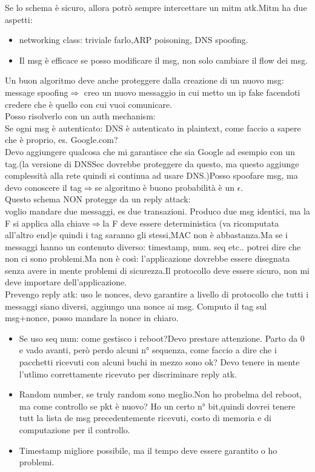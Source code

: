 \documentclass[16px]{article}
\begin{document}
Se lo schema è sicuro, allora potrò sempre intercettare un mitm atk.Mitm ha due aspetti:
\begin{itemize}
\item networking class: triviale farlo,ARP poisoning, DNS spoofing.\\
\item Il msg è efficace se posso modificare il msg, non solo cambiare il flow dei msg.
\end{itemize}
Un buon algoritmo deve anche proteggere dalla creazione di un nuovo msg: message spoofing$\Rightarrow$ creo un nuovo messaggio in cui metto un ip fake facendoti credere che è quello con cui vuoi comunicare.\\
Posso risolverlo con un auth mechanism:\\
Se ogni msg è autenticato: DNS è autenticato in plaintext, come faccio a sapere che è proprio, es. Google.com?\\
Devo aggiungere qualcosa che mi garantisce che sia Google ad esempio con un tag.(la versione di DNSSec dovrebbe proteggere da questo, ma questo aggiunge complessità alla rete quindi si continua ad usare DNS.)Posso spoofare msg, ma devo conoscere il tag$\Rightarrow$se algoritmo è buono probabilità è un $\epsilon$.\\
Questo schema NON protegge da un reply attack:\\
voglio mandare due messaggi, es due transazioni. Produco due msg identici, ma la F si applica alla chiave$\Rightarrow$la F deve essere deterministica (va ricomputata all'altro end)e quindi i tag saranno gli stessi,MAC non è abbastanza.Ma se i messaggi hanno un contenuto diverso: timestamp, num. seq etc.. potrei dire che non ci sono problemi.Ma non è così: l'applicazione dovrebbe essere disegnata senza avere in mente problemi di sicurezza.Il protocollo deve essere sicuro, non mi deve importare dell'applicazione.\\
Prevengo reply atk: uso le nonces, devo garantire a livello di protocollo che tutti i messaggi siano diversi, aggiungo una nonce ai msg. Computo il tag sul msg+nonce, posso mandare la nonce in chiaro.\\
\begin{itemize}
\item Se uso seq num: come gestisco i reboot?Devo prestare attenzione.
Parto da 0 e vado avanti, però perdo alcuni n° sequenza, come faccio a dire che i pacchetti ricevuti con alcuni buchi in mezzo sono ok? Devo tenere in mente l'utlimo correttamente ricevuto per discriminare reply atk.
\item Random number, se truly random sono meglio.Non ho probelma del reboot, ma come controllo se pkt è nuovo? Ho un certo n° bit,quindi dovrei tenere tutt la lista de msg precedentemente ricevuti, costo di memoria  e di computazione per il controllo.
\item Timestamp migliore possibile, ma il tempo deve essere garantito o ho problemi.
\end{itemize}
\end{document}
